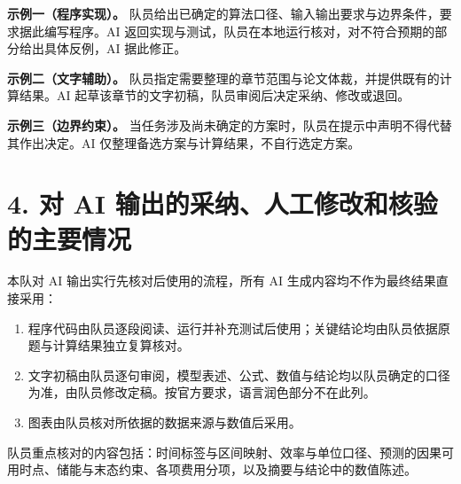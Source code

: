 \documentclass[12pt,a4paper,fontset=fandol]{ctexart}
\begin{document}
\textbf{示例一（程序实现）。} 队员给出已确定的算法口径、输入输出要求与边界条件，要求据此编写程序。AI 返回实现与测试，队员在本地运行核对，对不符合预期的部分给出具体反例，AI 据此修正。

\textbf{示例二（文字辅助）。} 队员指定需要整理的章节范围与论文体裁，并提供既有的计算结果。AI 起草该章节的文字初稿，队员审阅后决定采纳、修改或退回。

\textbf{示例三（边界约束）。} 当任务涉及尚未确定的方案时，队员在提示中声明不得代替其作出决定。AI 仅整理备选方案与计算结果，不自行选定方案。

\section*{4. 对 AI 输出的采纳、人工修改和核验的主要情况}

本队对 AI 输出实行先核对后使用的流程，所有 AI 生成内容均不作为最终结果直接采用：

\begin{enumerate}[leftmargin=2em]
\item 程序代码由队员逐段阅读、运行并补充测试后使用；关键结论均由队员依据原题与计算结果独立复算核对。
\item 文字初稿由队员逐句审阅，模型表述、公式、数值与结论均以队员确定的口径为准，由队员修改定稿。按官方要求，语言润色部分不在此列。
\item 图表由队员核对所依据的数据来源与数值后采用。
\end{enumerate}

队员重点核对的内容包括：时间标签与区间映射、效率与单位口径、预测的因果可用时点、储能与末态约束、各项费用分项，以及摘要与结论中的数值陈述。
\end{document}
